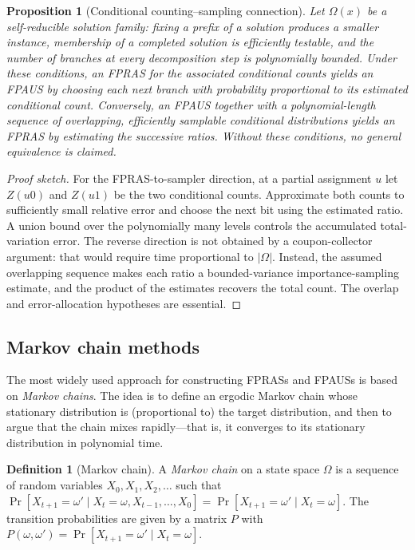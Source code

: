 \documentclass[twoside,12pt]{book}
\theoremstyle{plain}
\newtheorem{proposition}[theorem]{Proposition}
\theoremstyle{definition}
\newtheorem{definition}[theorem]{Definition}
\theoremstyle{remark}
\begin{document}
\begin{proposition}[Conditional counting--sampling connection]
\label{prop:count-sampling}
Let $\Omega(x)$ be a self-reducible solution family: fixing a prefix of a
solution produces a smaller instance, membership of a completed solution is
efficiently testable, and the number of branches at every decomposition step
is polynomially bounded. Under these conditions, an FPRAS for the associated
conditional counts yields an FPAUS by choosing each next branch with
probability proportional to its estimated conditional count. Conversely, an
FPAUS together with a polynomial-length sequence of overlapping, efficiently
samplable conditional distributions yields an FPRAS by estimating the
successive ratios. Without these conditions, no general equivalence is
claimed.
\end{proposition}

\begin{proof}[Proof sketch]
For the FPRAS-to-sampler direction, at a partial assignment $u$ let
$Z(u0)$ and $Z(u1)$ be the two conditional counts. Approximate both counts
to sufficiently small relative error and choose the next bit using the
estimated ratio. A union bound over the polynomially many levels controls
the accumulated total-variation error. The reverse direction is not obtained
by a coupon-collector argument: that would require time proportional to
$|\Omega|$. Instead, the assumed overlapping sequence makes each ratio a
bounded-variance importance-sampling estimate, and the product of the estimates
recovers the total count. The overlap and error-allocation hypotheses are
essential.
\end{proof}

\subsection{Markov chain methods}

The most widely used approach for constructing FPRASs and FPAUSs is based on \emph{Markov chains}. The idea is to define an ergodic Markov chain whose stationary distribution is (proportional to) the target distribution, and then to argue that the chain mixes rapidly---that is, it converges to its stationary distribution in polynomial time.

\begin{definition}[Markov chain]
A \emph{Markov chain} on a state space $\Omega$ is a sequence of random variables $X_0, X_1, X_2, \ldots$ such that $\Pr[X_{t+1} = \omega' \mid X_t = \omega, X_{t-1}, \ldots, X_0] = \Pr[X_{t+1} = \omega' \mid X_t = \omega]$. The transition probabilities are given by a matrix $P$ with $P(\omega, \omega') = \Pr[X_{t+1} = \omega' \mid X_t = \omega]$.
\end{definition}
\end{document}
